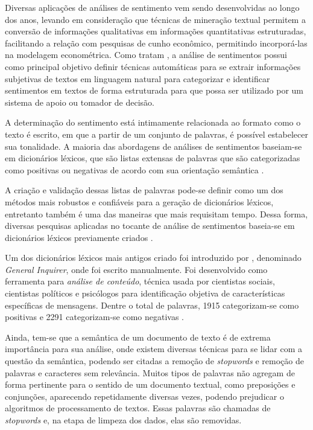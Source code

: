 Diversas aplicações de análises de sentimento vem sendo desenvolvidas ao longo dos anos, levando em consideração que técnicas de mineração textual permitem a conversão de informações qualitativas em informações quantitativas estruturadas, facilitando a relação com pesquisas de cunho econômico, permitindo incorporá-las na modelagem econométrica. Como tratam , a análise de sentimentos possui como principal objetivo definir técnicas automáticas para se extrair informações subjetivas de textos em linguagem natural para categorizar e identificar sentimentos em textos de forma estruturada para que possa ser utilizado por um sistema de apoio ou tomador de decisão.

A determinação do sentimento está intimamente relacionada ao formato como o texto é escrito, em que a partir de um conjunto de palavras, é possível estabelecer sua tonalidade. A maioria das abordagens de análises de sentimentos baseiam-se em dicionários léxicos, que são listas extensas de palavras que são categorizadas como positivas ou negativas de acordo com sua orientação semântica \cite{liu2010sentiment_subjectivity}.

A criação e validação dessas listas de palavras pode-se definir como um dos métodos mais robustos e confiáveis para a geração de dicionários léxicos, entretanto também é uma das maneiras que mais requisitam tempo. Dessa forma, diversas pesquisas aplicadas no tocante de análise de sentimentos baseia-se em dicionários léxicos previamente criados \cite{hutto2014vader}.

Um dos dicionários léxicos mais antigos criado foi introduzido por , denominado \textit{General Inquirer}, onde foi escrito manualmente. Foi desenvolvido como ferramenta para \textit{análise de conteúdo}, técnica usada por cientistas sociais, cientistas políticos e psicólogos para identificação objetiva de características específicas de mensagens. Dentre o total de palavras, 1915 categorizam-se como positivas e 2291 categorizam-se como negativas \cite{hutto2014vader}.

Ainda, tem-se que a semântica de um documento de texto é de extrema importância para sua análise, onde existem diversas técnicas para se lidar com a questão da semântica, podendo ser citadas a remoção de \textit{stopwords} e remoção de palavras e caracteres sem relevância. Muitos tipos de palavras não agregam de forma pertinente para o sentido de um documento textual, como preposições e conjunções, aparecendo repetidamente diversas vezes, podendo prejudicar o algoritmos de processamento de textos. Essas palavras são chamadas de \textit{stopwords} e, na etapa de limpeza dos dados, elas são removidas.

